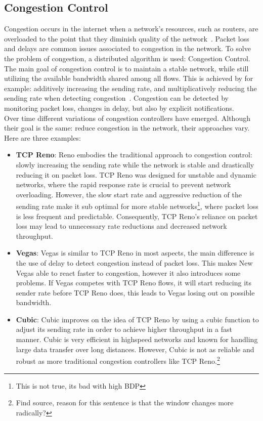 \documentclass[a4paper,english, 11pt]{report}
\begin{document}
\subsection{Congestion Control}
Congestion occurs in the internet when a network's resources, such as routers, are overloaded to the point that they diminish quality of the network~\cite{rfc6077}. Packet loss and delays are common issues associated to congestion in the network. To solve the problem of congestion, a distributed algorithm is used: Congestion Control. The main goal of congestion control is to maintain a stable network, while still utilizing the available bandwidth shared among all flows. This is achieved by for example: additively increasing the sending rate, and multiplicatively reducing the sending rate when detecting congestion~\cite{welzl_congestion}. Congestion can be detected by monitoring packet loss, changes in delay, but also by explicit notifications.\\

Over time different variations of congestion controllers have emerged. Although their goal is the same: reduce congestion in the network, their approaches vary. Here are three examples:

\begin{itemize}
  \item \textbf{TCP Reno}: Reno embodies the traditional approach to congestion control: slowly increasing the sending rate while the network is stable and drastically reducing it on packet loss. TCP Reno was designed for unstable and dynamic networks, where the rapid response rate is crucial to prevent network overloading. However, the slow start rate and aggressive reduction of the sending rate make it sub optimal for more stable networks\footnote{This is not true, its bad with high BDP}, where packet loss is less frequent and predictable. Consequently, TCP Reno's reliance on packet loss may lead to unnecessary rate reductions and decreased network throughput.
  \item \textbf{Vegas}: Vegas is similar to TCP Reno in most aspects, the main difference is the use of delay to detect congestion instead of packet loss. This makes New Vegas able to react faster to congestion, however it also introduces some problems. If Vegas competes with TCP Reno flows, it will start reducing its sender rate before TCP Reno does, this leads to Vegas losing out on possible bandwidth. 
  \item \textbf{Cubic}: Cubic improves on the idea of TCP Reno by using a cubic function to adjust its sending rate in order to achieve higher throughput in a fast manner. Cubic is very efficient in highspeed networks and known for handling large data transfer over long distances. However, Cubic is not as reliable and robust as more traditional congestion controllers like TCP Reno.\footnote{Find source, reason for this sentence is that the window changes  more radically?}
\end{itemize}
\end{document}
